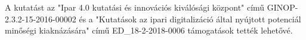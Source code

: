 \chapter*{\koszonetnyilvanitas}

A kutatást az "Ipar 4.0 kutatási és innovációs kiválósági központ" című
GINOP-2.3.2-15-2016-00002 és a "Kutatások az ipari digitalizáció által
nyújtott potenciál minőségi kiaknázására" című ED\_18-2-2018-0006
támogatások tették lehetővé.